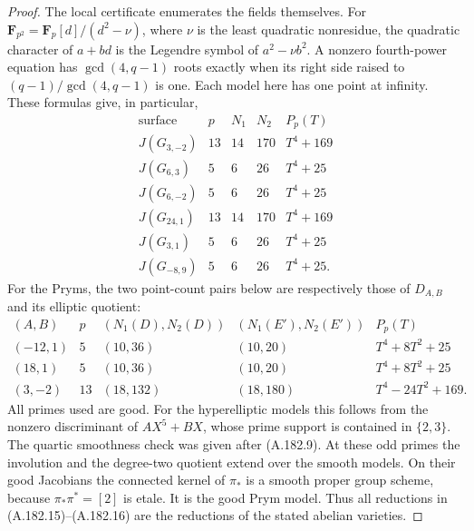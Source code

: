 \begin{proof}
The local certificate enumerates the fields themselves.  For
\(\mathbf F_{p^2}=\mathbf F_p[d]/(d^2-\nu)\), where \(\nu\)
is the least quadratic nonresidue, the quadratic character of
\(a+bd\) is the Legendre symbol of \(a^2-\nu b^2\).
A nonzero fourth-power equation has \(\gcd(4,q-1)\) roots
exactly when its right side raised to
\((q-1)/\gcd(4,q-1)\) is one.  Each model here has one point
at infinity.  These formulas give, in particular,
\[
\begin{array}{c|c|c|c|c}
\text{surface}&p&N_1&N_2&P_p(T)\\ \hline
J(G_{3,-2})&13&14&170&T^4+169\\
J(G_{6,3})&5&6&26&T^4+25\\
J(G_{6,-2})&5&6&26&T^4+25\\
J(G_{24,1})&13&14&170&T^4+169\\
J(G_{3,1})&5&6&26&T^4+25\\
J(G_{-8,9})&5&6&26&T^4+25.
\end{array}
\tag{A.182.15}
\]
For the Pryms, the two point-count pairs below are respectively
those of \(D_{A,B}\) and its elliptic quotient:
\[
\begin{array}{c|c|c|c|c}
(A,B)&p&(N_1(D),N_2(D))&(N_1(E'),N_2(E'))&P_p(T)\\ \hline
(-12,1)&5&(10,36)&(10,20)&T^4+8T^2+25\\
(18,1)&5&(10,36)&(10,20)&T^4+8T^2+25\\
(3,-2)&13&(18,132)&(18,180)&T^4-24T^2+169.
\end{array}
\tag{A.182.16}
\]
All primes used are good.  For the hyperelliptic models this
follows from the nonzero discriminant of \(AX^5+BX\), whose
prime support is contained in \(\{2,3\}\).  The quartic
smoothness check was given after (A.182.9).  At these odd primes
the involution and the degree-two quotient extend over the
smooth models.  On their good Jacobians the connected kernel
of \(\pi_*\) is a smooth proper group scheme, because
\(\pi_*\pi^*=[2]\) is etale.  It is the good Prym model.
Thus all reductions in (A.182.15)--(A.182.16) are the reductions
of the stated abelian varieties.


\end{proof}
